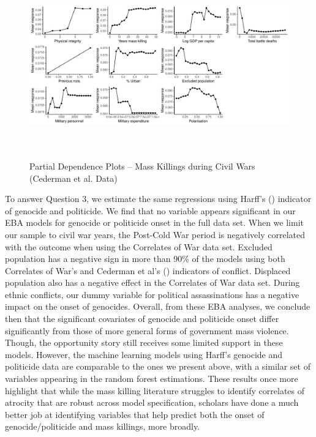 \documentclass[a4paper,12pt]{article}
\begin{document}
\begin{figure}[H]
    \begin{center}
    \includegraphics[width=\textwidth, height=8cm]{images/rf-cow-pd.pdf}
    \caption{Partial Dependence Plots -- Mass Killings during Civil Wars (Cederman et al. Data)}
    \label{fig:drfdpp4}
    \end{center}
\end{figure}
	
To answer Question 3,  we estimate the same regressions using Harff's (\citeyear{harff2003no}) indicator of genocide and politicide. We find that no variable appears significant in our EBA models for genocide or politicide onset in the full data set. When we limit our sample to civil war years, the Post-Cold War period is negatively correlated with the outcome when using the Correlates of War data set. Excluded population has a negative sign in more than 90\% of the models using both Correlates of War's and Cederman et al's (\citeyear{cederman2010ethnic}) indicators of conflict. Displaced population also has a negative effect in the Correlates of War data set. During ethnic conflicts, our dummy variable for political assassinations has a negative impact on the onset of genocides. Overall, from these EBA analyses, we conclude then that the significant covariates of genocide and politicide onset differ significantly from those of more general forms of government mass violence. Though, the opportunity story still receives some limited support in these models. However, the machine learning models using Harff's genocide and politicide data are comparable to the ones we present above, with a similar set of variables appearing in the random forest estimations. These results once more highlight that while the mass killing literature struggles to identify correlates of atrocity that are robust across model specification, scholars have done a much better job at identifying variables that help predict both the onset of genocide/politicide and mass killings, more broadly.
	
\end{document}
